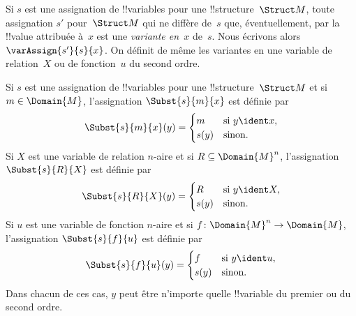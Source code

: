 \documentclass[../../../include/open-logic-section]{subfiles}
\begin{document}
\begin{defn}[Variante en~$x$]
Si $s$ est une assignation de !!{variable}s pour
une !!{structure}~$\Struct M$, toute assignation
$s'$ pour~$\Struct M$ qui ne diffère de~$s$ que,
éventuellement, par la !!{value} attribuée à~$x$
est une \emph{variante en~$x$} de~$s$.
Nous écrivons alors $\varAssign{s'}{s}{x}$.
On définit de même les variantes en une variable
de relation~$X$ ou de fonction~$u$ du second ordre.
\end{defn}

\begin{defn}
Si $s$ est une assignation de !!{variable}s pour
une !!{structure}~$\Struct M$ et si
$m\in\Domain{M}$, l'assignation
$\Subst{s}{m}{x}$ est définie par
\[
\Subst{s}{m}{x}(y)=\begin{cases}
  m & \text{si }y\ident x,\\
  s(y) & \text{sinon}.
\end{cases}
\]
Si $X$ est une variable de relation $n$-aire et
si $R\subseteq\Domain{M}^n$, l'assignation
$\Subst{s}{R}{X}$ est définie par
\[
\Subst{s}{R}{X}(y)=\begin{cases}
  R & \text{si }y\ident X,\\
  s(y) & \text{sinon}.
\end{cases}
\]
Si $u$ est une variable de fonction $n$-aire et
si $f\colon\Domain{M}^n\to\Domain{M}$,
l'assignation $\Subst{s}{f}{u}$ est définie par
\[
\Subst{s}{f}{u}(y)=\begin{cases}
  f & \text{si }y\ident u,\\
  s(y) & \text{sinon}.
\end{cases}
\]
Dans chacun de ces cas, $y$ peut être n'importe
quelle !!{variable} du premier ou du second ordre.
\end{defn}
\end{document}
